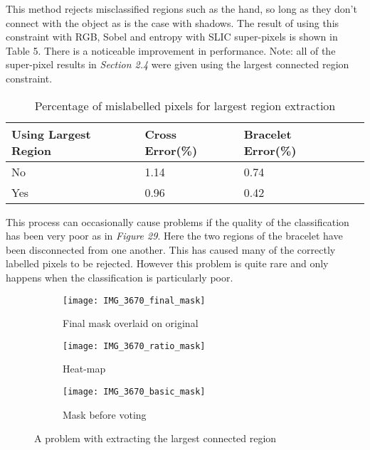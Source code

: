 \documentclass[12pt]{IIBproject}
\begin{document}
This method rejects misclassified regions such as the hand, so long as they don't connect with the object as is the case with shadows. The result of using this constraint with RGB, Sobel and entropy with SLIC super-pixels is shown in Table 5. There is a noticeable improvement in performance. Note: all of the super-pixel results in \emph{Section 2.4} were given using the largest connected region constraint.
\begin{table}[H]
\begin{center}
    \begin{tabular}{ | l | l | l | p{5cm} |}
    \hline
    Using Largest Region & Cross Error(\%) & Bracelet Error(\%) \\ \hline
    No & 1.14 & 0.74 \\ \hline
    Yes & 0.96 & 0.42 \\
    \hline
    
    \end{tabular}
    \caption{Percentage of mislabelled pixels for largest region extraction}\label{table:somename}
\end{center}
\end{table}
This process can occasionally cause problems if the quality of the classification has been very poor as in \emph{Figure 29}. Here the two regions of the bracelet have been disconnected from one another. This has caused many of the correctly labelled pixels to be rejected. However this problem is quite rare and only happens when the classification is particularly poor. 

\begin{figure}[H]
\centering
\begin{subfigure}{.5\textwidth}
  \centering
  \texttt{[image: IMG\_3670\_final\_mask]}
  \caption{Final mask overlaid on original}
  \label{fig:sub2}
\end{subfigure}
\begin{subfigure}{.5\textwidth}
  \centering
  \texttt{[image: IMG\_3670\_ratio\_mask]}
  \caption{Heat-map}
  \label{fig:sub1}
\end{subfigure}%
\begin{subfigure}{.5\textwidth}
  \centering
  \texttt{[image: IMG\_3670\_basic\_mask]}
  \caption{Mask before voting}
  \label{fig:sub2}
\end{subfigure}

\caption{A problem with extracting the largest connected region}
\label{fig:test}
\end{figure}
\end{document}
